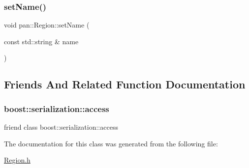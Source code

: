 \mbox{\label{classpan_1_1_region_a0138c13e4ba5d07029dd9bb641c8b1ef}} 
\subsubsection{\texorpdfstring{set\+Name()}{setName()}}
{\footnotesize\ttfamily void pan\+::\+Region\+::set\+Name (\begin{DoxyParamCaption}\item[{const std\+::string \&}]{name }\end{DoxyParamCaption})\hspace{0.3cm}{\ttfamily [inline]}}



\subsection{Friends And Related Function Documentation}
\mbox{\label{classpan_1_1_region_ac98d07dd8f7b70e16ccb9a01abf56b9c}} 
\subsubsection{\texorpdfstring{boost\+::serialization\+::access}{boost::serialization::access}}
{\footnotesize\ttfamily friend class boost\+::serialization\+::access\hspace{0.3cm}{\ttfamily [friend]}}



The documentation for this class was generated from the following file\+:\begin{DoxyCompactItemize}
\item 
\hyperlink{_region_8h}{Region.\+h}\end{DoxyCompactItemize}
